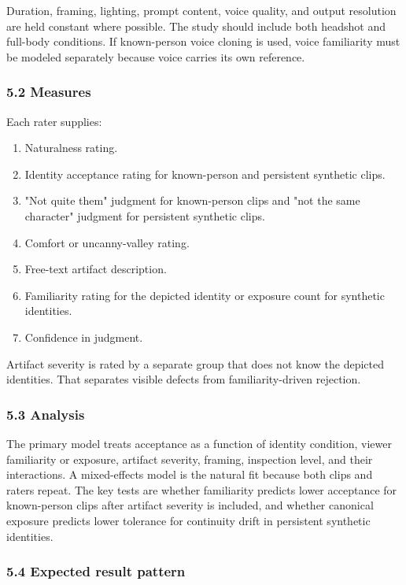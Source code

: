 \documentclass[
]{article}
\providecommand{\tightlist}{%
  \setlength{\itemsep}{0pt}\setlength{\parskip}{0pt}}
\begin{document}
Duration, framing, lighting, prompt content, voice quality, and output
resolution are held constant where possible. The study should include
both headshot and full-body conditions. If known-person voice cloning is
used, voice familiarity must be modeled separately because voice carries
its own reference.

\subsubsection{5.2 Measures}\label{52-measures}

Each rater supplies:

\begin{enumerate}
\def\labelenumi{\arabic{enumi}.}
\tightlist
\item
  Naturalness rating.
\item
  Identity acceptance rating for known-person and persistent synthetic
  clips.
\item
  "Not quite them" judgment for known-person clips and "not the same
  character" judgment for persistent synthetic clips.
\item
  Comfort or uncanny-valley rating.
\item
  Free-text artifact description.
\item
  Familiarity rating for the depicted identity or exposure count for
  synthetic identities.
\item
  Confidence in judgment.
\end{enumerate}

Artifact severity is rated by a separate group that does not know the
depicted identities. That separates visible defects from
familiarity-driven rejection.

\subsubsection{5.3 Analysis}\label{53-analysis}

The primary model treats acceptance as a function of identity condition,
viewer familiarity or exposure, artifact severity, framing, inspection
level, and their interactions. A mixed-effects model is the natural fit
because both clips and raters repeat. The key tests are whether
familiarity predicts lower acceptance for known-person clips after
artifact severity is included, and whether canonical exposure predicts
lower tolerance for continuity drift in persistent synthetic identities.

\subsubsection{5.4 Expected result
pattern}\label{54-expected-result-pattern}
\end{document}
